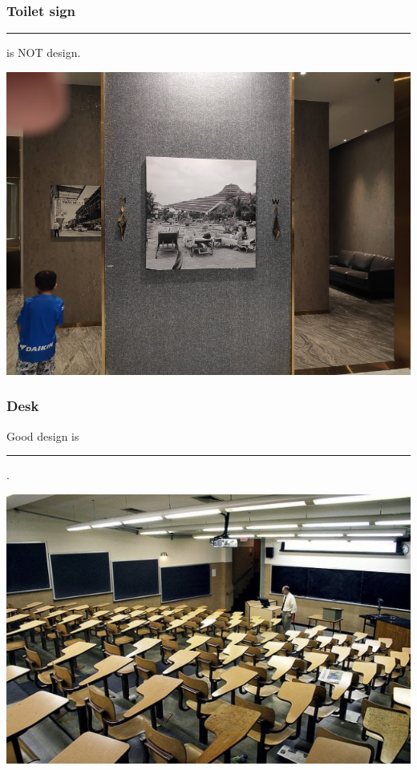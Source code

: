 \documentclass{beamer}
\begin{document}
\begin{frame}
\frametitle{Toilet sign}

\begin{center}
\rule{2cm}{0.15mm} is NOT design.
\end{center}
%	
	\centering
	\includegraphics[width=0.7\linewidth]{toilet}
%	
\end{frame}

\begin{frame}
	\frametitle{Desk}
	\begin{center}
Good design is \rule{2cm}{0.15mm}.
\end{center}
%		
		\centering
		\includegraphics[width=0.8\linewidth]{desk}
%		
\end{frame}
\end{document}
